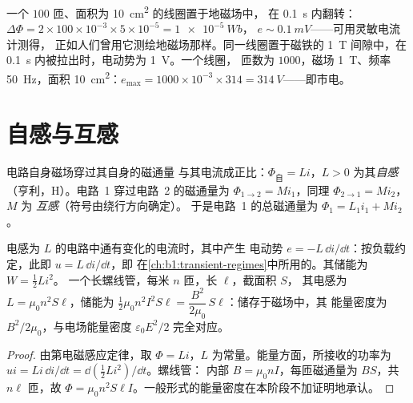 \begin{example}[数量级]\label{ex:b1:induction:orders}
一个 $100$ 匝、面积为 \qty{10}{cm^2} 的线圈置于地磁场中，
在 \qty{0.1}{s} 内翻转：$\Delta\Phi = 2 \times 100 \times 10^{-3} \times 5 \times 10^{-5} = \qty{1e-5}{Wb}$，
$e \sim \qty{0.1}{mV}$——可用灵敏电流计测得，
正如人们曾用它测绘地磁场那样。同一线圈置于磁铁的
\qty{1}{T} 间隙中，在 \qty{0.1}{s} 内被拉出时，电动势为 \qty{1}{V}。一个线圈，
匝数为 $1000$，磁场 \qty{1}{T}、频率 \qty{50}{Hz}，面积 \qty{10}{cm^2}：$e_{\max} =
1000 \times 10^{-3} \times 314 = \qty{314}{V}$——即市电。
\end{example}

\section{自感与互感}

\begin{definition}[电感]\label{def:b1:induction:inductance}
电路自身磁场穿过其自身的磁通量
与其电流成正比：$\Phi_{\text{自}} = Li$，$L > 0$ 为其\emph{自感}
（亨利，\unit{H}）。电路~1 穿过电路~2 的磁通量为
$\Phi_{1 \to 2} = Mi_1$，同理 $\Phi_{2 \to 1} = Mi_2$，$M$ 为
\emph{互感}（符号由绕行方向确定）。
于是电路~1 的总磁通量为 $\Phi_1 = L_1i_1 + Mi_2$。
\end{definition}

\begin{proposition}\label{prop:b1:induction:inductor}
电感为 $L$ 的电路中通有变化的电流时，其中产生
电动势 $e = -L\,\dd i/\dd t$：按负载约定，此即
 $u = L\,\dd i/\dd t$，即
在\cref{ch:b1:transient-regimes}中所用的。其储能为 $W = \tfrac12Li^2$。
一个长螺线管，每米 $n$ 匝，长 $\ell$，截面积 $S$，
其电感为 $L = \mu_0n^2S\ell$，储能为 $\tfrac12\mu_0n^2I^2S\ell =
\dfrac{B^2}{2\mu_0}\,S\ell$：储存于磁场中，其
能量密度为 $B^2/2\mu_0$，与电场能量密度 $\varepsilon_0E^2/2$ 完全对应。
\end{proposition}

\begin{proof}
由第电磁感应定律，取 $\Phi = Li$，$L$ 为常量。能量方面，所接收的功率为
$ui = Li\,\dd i/\dd t = \dd(\tfrac12Li^2)/\dd t$。螺线管：
内部 $B = \mu_0nI$，每匝磁通量为 $BS$，共 $n\ell$ 匝，故 $\Phi =
\mu_0n^2S\ell I$。一般形式的能量密度在本阶段不加证明地承认。
\end{proof}

